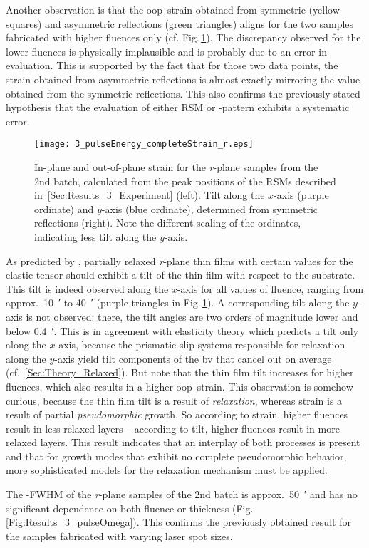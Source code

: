 {\sloppy %
Another observation is that the \gls{oop}\ strain obtained from symmetric (yellow squares) and asymmetric reflections (green triangles) aligns for the two samples fabricated with higher fluences only (cf. Fig.\,\ref{Fig:Results_3_pulse_r_StrainTilt}).
The discrepancy observed for the lower fluences is physically implausible and is probably due to an error in evaluation.
This is supported by the fact that for those two data points, the strain obtained from asymmetric reflections is almost exactly mirroring the value obtained from the symmetric reflections.
This also confirms the previously stated hypothesis that the evaluation of either \gls{RSM} or \thetaomega-pattern exhibits a systematic error.
\par}
\begin{figure}
    \centering
    \texttt{[image: 3\_pulseEnergy\_completeStrain\_r.eps]}
    \caption{
        In-plane and out-of-plane strain for the \textit{r}-plane samples from the 2nd batch, calculated from the peak positions of the \glspl{RSM} described in~\ref{Sec:Results_3_Experiment} (left).
        Tilt along the $x$-axis (purple ordinate) and $y$-axis (blue ordinate), determined from symmetric reflections (right).
        Note the different scaling of the ordinates, indicating less tilt along the $y$-axis.
    }
    \label{Fig:Results_3_pulse_r_StrainTilt}
\end{figure}

As predicted by \textcite{grundmann2020b}, partially relaxed \textit{r}-plane thin films with certain values for the elastic tensor should exhibit a tilt of the thin film with respect to the substrate.
This tilt is indeed observed along the $x$-axis for all values of fluence, ranging from approx.\ \qty{10}{\arcminute} to \qty{40}{\arcminute} (purple triangles in Fig.\,\ref{Fig:Results_3_pulse_r_StrainTilt}).
A corresponding tilt along the $y$-axis is not observed: there, the tilt angles are two orders of magnitude lower and below \qty{0.4}{\arcminute}.
This is in agreement with elasticity theory which predicts a tilt only along the $x$-axis, because the prismatic slip systems responsible for relaxation along the $y$-axis yield tilt components of the \gls{bv} that cancel out on average (cf.~\ref{Sec:Theory_Relaxed}).
But note that the thin film tilt increases for higher fluences, which also results in a higher \gls{oop}\ strain.
This observation is somehow curious, because the thin film tilt is a result of \emph{relaxation}, whereas strain is a result of partial \emph{pseudomorphic} growth.
So according to strain, higher fluences result in less relaxed layers -- according to tilt, higher fluences result in more relaxed layers.
This result indicates that an interplay of both processes is present and that for growth modes that exhibit no complete pseudomorphic behavior, more sophisticated models for the relaxation mechanism must be applied.

The \textomega-FWHM of the \textit{r}-plane samples of the 2nd batch is approx.\ \qty{50}{\arcminute} and has no significant dependence on both fluence or thickness (Fig.\,\ref{Fig:Results_3_pulseOmega}).
This confirms the previously obtained result for the samples fabricated with varying laser spot sizes.